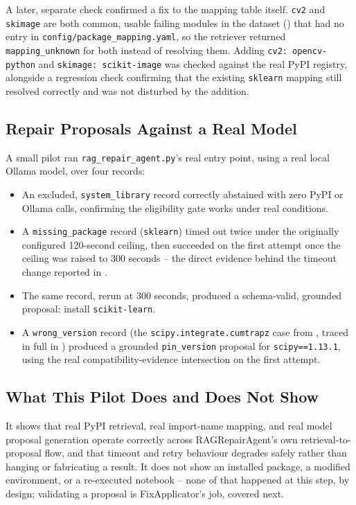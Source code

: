 A later, separate check confirmed a fix to the mapping table itself.
\texttt{cv2} and \texttt{skimage} are both common, usable failing modules in
the dataset () that had no entry in
\texttt{config/package\_mapping.yaml}, so the retriever returned
\texttt{mapping\_unknown} for both instead of resolving them. Adding
\texttt{cv2: opencv-python} and \texttt{skimage: scikit-image} was checked
against the real PyPI registry, alongside a regression check confirming
that the existing \texttt{sklearn} mapping still resolved correctly and was
not disturbed by the addition.

\subsection{Repair Proposals Against a Real Model}

A small pilot ran \texttt{rag\_repair\_agent.py}'s real entry point, using a
real local Ollama model, over four records:

\begin{itemize}
  \item An excluded, \texttt{system\_library} record correctly abstained
        with zero PyPI or Ollama calls, confirming the eligibility gate
        works under real conditions.
  \item A \texttt{missing\_package} record (\texttt{sklearn}) timed out
        twice under the originally configured 120-second ceiling, then
        succeeded on the first attempt once the ceiling was raised to 300
        seconds -- the direct evidence behind the timeout change reported
        in .
  \item The same record, rerun at 300 seconds, produced a schema-valid,
        grounded proposal: install \texttt{scikit-learn}.
  \item A \texttt{wrong\_version} record (the \texttt{scipy.integrate.cumtrapz}
        case from , traced in full in
        ) produced a grounded
        \texttt{pin\_version} proposal for \texttt{scipy==1.13.1}, using the
        real compatibility-evidence intersection on the first attempt.
\end{itemize}

\subsection{What This Pilot Does and Does Not Show}

It shows that real PyPI retrieval, real import-name mapping, and real model
proposal generation operate correctly across RAGRepairAgent's own
retrieval-to-proposal flow, and that timeout and retry behaviour degrades
safely rather than hanging or fabricating a result. It does not show an
installed package, a modified environment, or a re-executed notebook --
none of that happened at this step, by design; validating a proposal is
FixApplicator's job, covered next.

